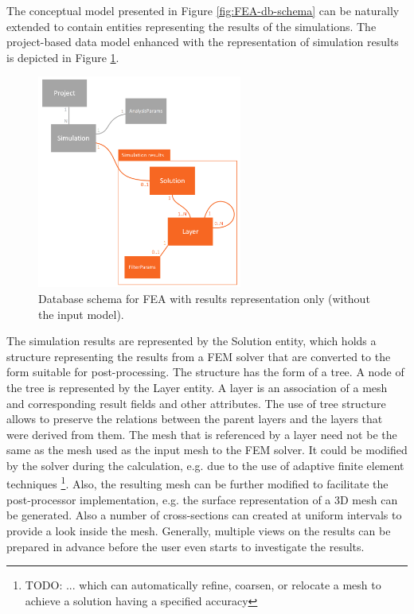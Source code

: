 
The conceptual model presented in Figure \ref{fig:FEA-db-schema} can be naturally extended to contain entities representing the results of the simulations. The project-based data model enhanced with the representation of simulation results is depicted in Figure \ref{fig:FEA-db-schema-results}.

\begin{figure}[H]
    \centering
    \includegraphics[width=0.6\textwidth]{figures/chapter-data-management/FEA-database-schema-only-results}
    \decoRule
    \caption[Database schema for FEA with results representation only]{Database schema for FEA with results representation only (without the input model).}
    \label{fig:FEA-db-schema-results}
\end{figure}

The simulation results are represented by the Solution entity, which holds a structure representing the results from a FEM solver that are converted to the form suitable for post-processing. The structure has the form of a tree. A node of the tree is represented by the Layer entity. A layer is an association of a mesh and corresponding result fields and other attributes. The use of tree structure allows to preserve the relations between the parent layers and the layers that were derived from them. The mesh that is referenced by a layer need not be the same as the mesh used as the input mesh to the FEM solver. It could be modified by the solver during the calculation, e.g. due to the use of adaptive finite element techniques \footnote{TODO: ... which can automatically refine, coarsen, or relocate a mesh to achieve a solution having a specified accuracy}. Also, the resulting mesh can be further modified to facilitate the post-processor implementation, e.g. the surface representation of a 3D mesh can be generated. Also a number of cross-sections can created at uniform intervals to provide a look inside the mesh. Generally, multiple views on the results can be prepared in advance before the user even starts to investigate the results.

